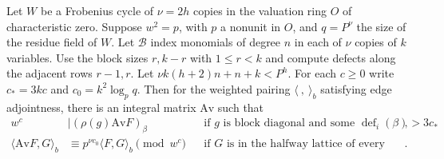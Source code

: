 \begin{lemma}
\label{lem:a-edge-average}
\emitthmsource
Let $W$ be a Frobenius cycle of $\nu=2h$ copies in the valuation ring $O$ of characteristic zero. Suppose $w^2=p$, with $p$ a nonunit in $O$, and $q=P^\nu$ the size of the residue field of $W$.
Let $\mathcal B$ index monomials of degree $n$ in each of $\nu$ copies of $k$ variables.
Use the block sizes $r,k-r$ with $1\le r<k$ and compute defects along the adjacent rows $r-1,r$.
Let $\nu k(h+2)n+n+k<P^h$. For each $c\ge0$ write $c_\ast=3kc$ and $c_0=k^2\log_p q$.
Then for the weighted pairing $\langle\ ,\ \rangle_b$ satisfying edge adjointness, there is an integral matrix $\mathrm{Av}$ such that
\[
 \begin{aligned}
 w^c&\mid (\rho(g)\mathrm{Av} F)_\beta
     &&\text{if $g$ is block diagonal and some $\operatorname{def}_i(\beta)>3c_\ast$},\\
 \langle\mathrm{Av} F,G\rangle_b
   &\equiv p^{\nu c_0}\langle F,G\rangle_b \pmod{w^c}
     &&\text{if $G$ is in the halfway lattice of every outgoing edge}.
 \end{aligned}
\]
\end{lemma}

